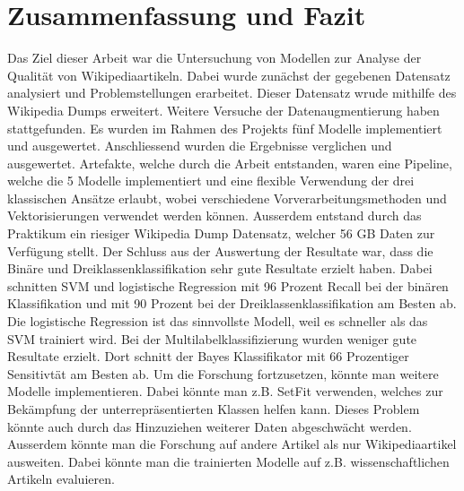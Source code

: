 \section{Zusammenfassung und Fazit}
\label{ZusammenfassungUndFazit}
Das Ziel dieser Arbeit war die Untersuchung von Modellen zur Analyse der Qualität von Wikipediaartikeln. Dabei wurde zunächst der gegebenen Datensatz analysiert und Problemstellungen erarbeitet. Dieser Datensatz wrude mithilfe des Wikipedia Dumps erweitert. Weitere Versuche der Datenaugmentierung haben stattgefunden. Es wurden im Rahmen des Projekts fünf Modelle implementiert und ausgewertet. Anschliessend wurden die Ergebnisse verglichen und ausgewertet. Artefakte, welche durch die Arbeit entstanden, waren eine Pipeline, welche die 5 Modelle implementiert und eine flexible Verwendung der drei klassischen Ansätze erlaubt, wobei verschiedene Vorverarbeitungsmethoden und Vektorisierungen verwendet werden können. Ausserdem entstand durch das Praktikum ein riesiger Wikipedia Dump Datensatz, welcher 56 GB Daten zur Verfügung stellt.
Der Schluss aus der Auswertung der Resultate war, dass die Binäre und Dreiklassenklassifikation sehr gute Resultate erzielt haben. Dabei schnitten SVM und logistische Regression mit 96 Prozent Recall bei der binären Klassifikation und mit 90 Prozent bei der Dreiklassenklassifikation am Besten ab. Die logistische Regression ist das sinnvollste Modell, weil es schneller als das SVM trainiert wird. Bei der Multilabelklassifizierung wurden weniger gute Resultate erzielt. Dort schnitt der Bayes Klassifikator mit 66 Prozentiger Sensitivtät am Besten ab. Um die Forschung fortzusetzen, könnte man weitere Modelle implementieren. Dabei könnte man z.B. SetFit verwenden, welches zur Bekämpfung der unterrepräsentierten Klassen helfen kann. Dieses Problem könnte auch durch das Hinzuziehen weiterer Daten abgeschwächt werden. Ausserdem könnte man die Forschung auf andere Artikel als nur Wikipediaartikel ausweiten. Dabei könnte man die trainierten Modelle auf z.B. wissenschaftlichen Artikeln evaluieren. 